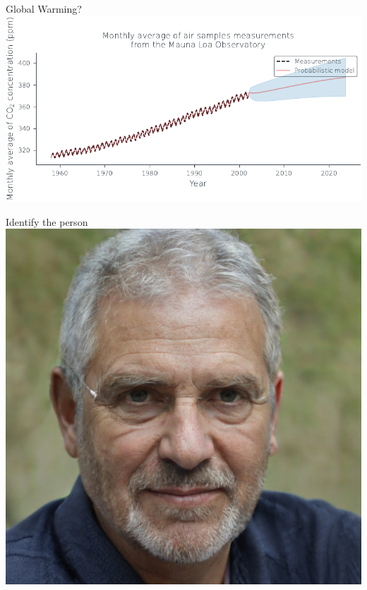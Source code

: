 \documentclass[handout]{beamer}
\begin{document}
\begin{frame}{Global Warming?}
    \includegraphics[width=\textwidth]{../figures/introduction/future_full.pdf}    
    
\end{frame}

\begin{frame}{Identify the person}
\includegraphics[height=\textwidth]{../figures/introduction/famous.jpeg}    
\end{frame}
\end{document}
